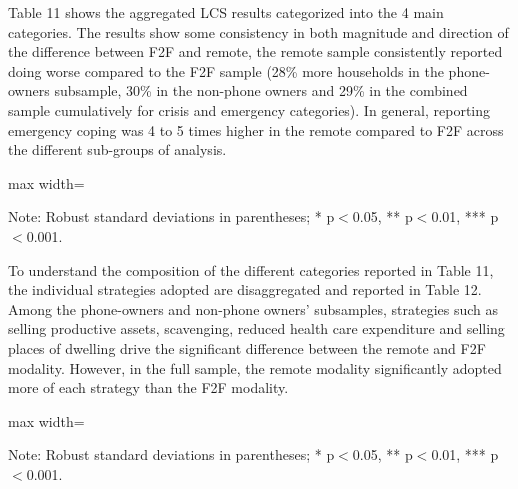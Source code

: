 \documentclass[11pt,harvard]{article}
\begin{document}
	Table 11 shows the aggregated LCS results categorized into the 4 main categories. The results show some consistency in both magnitude and direction of the difference between F2F and remote, the remote sample consistently reported doing worse compared to the F2F sample (28\% more households in the phone-owners subsample, 30\%  in the non-phone owners and 29\% in the combined sample cumulatively for crisis and emergency categories). In general, reporting emergency coping was 4 to 5 times higher in the remote compared to F2F across the different sub-groups of analysis.
	
	\begin{table}[htbp]
		\centering
		\begin{adjustbox}{max width=\textwidth}
			\begin{threeparttable}
				\caption{Impact of Survey Modality on Livelihood Coping Strategy}
				\scriptsize
				 
				\label{tab:LCS_Modality_BF}
				\begin{tablenotes}
					\item Note: Robust standard deviations in parentheses; * p$<$0.05, ** p$<$0.01, *** p$<$0.001. 
				\end{tablenotes}
			\end{threeparttable}
		\end{adjustbox}
	\end{table}
	
	To understand the composition of the different categories reported in Table 11, the individual strategies adopted are disaggregated and reported in Table 12. Among the phone-owners and non-phone owners' subsamples, strategies such as selling productive assets, scavenging, reduced health care expenditure and selling places of dwelling drive the significant difference between the remote and F2F modality. However, in the full sample, the remote modality significantly adopted more of each strategy than the F2F modality.
	
	\begin{table}[htbp]
		\centering
		\begin{adjustbox}{max width=\textwidth}
			\begin{threeparttable}
				\caption{CAR: Each Coping Strategy Used}
				\scriptsize
				 
				\label{tab:LCS_Ind_Modality_BF}
				\begin{tablenotes}
					\item Note: Robust standard deviations in parentheses; * p$<$0.05, ** p$<$0.01, *** p$<$0.001.
				\end{tablenotes}
			\end{threeparttable}
		\end{adjustbox}
	\end{table}
	
\end{document}
